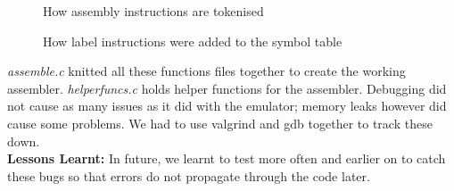 \documentclass[11pt]{article}
\begin{document}
\begin{figure}[h]
    \centering
    \caption{How assembly instructions are tokenised}
    \label{fig:tokenisation}
\end{figure}
\begin{figure}[t]
    \centering
    \caption{How label instructions were added to the symbol table}
    \label{fig:scp-flowchart}
\end{figure}
\textit{assemble.c} knitted all these functions files together to create the working assembler. \textit{helperfuncs.c} holds helper functions for the assembler.
Debugging did not cause as many issues as it did with the emulator; memory leaks however did cause some problems. We had to use valgrind and gdb together to track these down.\\
\textbf{Lessons Learnt: }In future, we learnt to test more often and earlier on to catch these bugs so that errors do not propagate through the code later.
\end{document}
